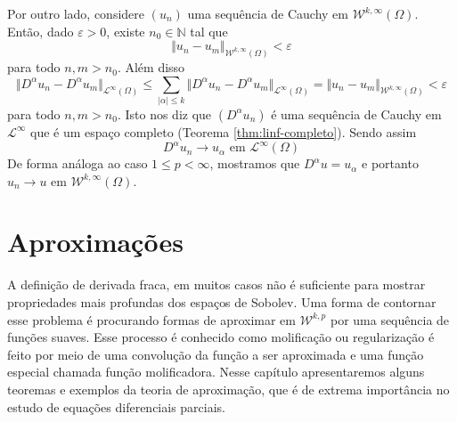 \documentclass[a4paper, 11pt]{book}
\theoremstyle{definition}
\newcommand{\bN}{\mathbb{N}}
\newcommand{\cL}{\mathcal{L}}
\newcommand{\cW}{\mathcal{W}}
\begin{document}
\begin{prf}
    Por outro lado, considere $(u_n)$ uma sequência de Cauchy em $\cW^{k,\infty}(\Omega)$. Então, dado $\varepsilon > 0$, existe $n_0 \in \bN$ tal que
    \[
        \Vert u_n - u_m \Vert_{\cW^{k,\infty}(\Omega)} < \varepsilon
    \]
    para todo $n,m > n_0$. Além disso
    \[
        \Vert D^\alpha u_n - D^\alpha u_m \Vert_{\cL^\infty(\Omega)} \leqslant \sum_{|\alpha| \leqslant k} \Vert D^\alpha u_n - D^\alpha u_m \Vert_{\cL^\infty(\Omega)} = \Vert u_n - u_m \Vert_{\cW^{k,\infty}(\Omega)} < \varepsilon
    \]
    para todo $n,m > n_0$. Isto nos diz que $(D^\alpha u_n)$ é uma sequência de Cauchy em $\cL^\infty$ que é um espaço completo (Teorema \ref{thm:linf-completo}). Sendo assim
    \[
        D^{\alpha} u_n \to u_\alpha \text{ em } \cL^\infty(\Omega)
    \]
    De forma análoga ao caso $1 \leqslant p < \infty$, mostramos que $D^\alpha u = u_\alpha$ e portanto $u_n \to u$ em $\cW^{k,\infty}(\Omega)$.
\end{prf}

\section{Aproximações} \label{sec:aproximacoes}


A definição de derivada fraca, em muitos casos não é suficiente para mostrar propriedades mais profundas dos espaços de Sobolev.
Uma forma de contornar esse problema é procurando formas de aproximar em $\cW^{k,p}$ por uma sequência de funções suaves.
Esse processo é conhecido como molificação ou regularização é feito por meio de uma convolução da função a ser aproximada e uma função especial chamada função molificadora. 
Nesse capítulo apresentaremos alguns teoremas e exemplos da teoria de aproximação, que é de extrema importância no estudo de equações diferenciais parciais.
\end{document}
